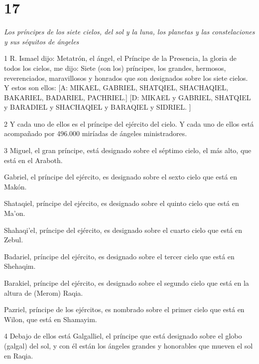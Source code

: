 \chapter{17}

\par \textit{Los príncipes de los siete cielos, del sol y la luna, los planetas y las constelaciones y sus séquitos de ángeles}

\par 1 R. Ismael dijo: Metatrón, el ángel, el Príncipe de la Presencia, la gloria de todos los cielos, me dijo: Siete (son los) príncipes, los grandes, hermosos, reverenciados, maravillosos y honrados que son designados sobre los siete cielos. Y estos son ellos: [A: MIKAEL, GABRIEL, SHATQIEL, SHACHAQIEL, BAKARIEL, BADARIEL, PACHRIEL.] [D: MIKAEL y GABRIEL, SHATQIEL y BARADIEL y SHACHAQIEL y BARAQIEL y SIDRIEL. ]

\par 2 Y cada uno de ellos es el príncipe del ejército del cielo. Y cada uno de ellos está acompañado por 496.000 miríadas de ángeles ministradores.

\par 3 Miguel, el gran príncipe, está designado sobre el séptimo cielo, el más alto, que está en el Araboth.

\par Gabriel, el príncipe del ejército, es designado sobre el sexto cielo que está en Makón.

\par Shataqiel, príncipe del ejército, es designado sobre el quinto cielo que está en Ma'on.

\par Shahaqi'el, príncipe del ejército, es designado sobre el cuarto cielo que está en Zebul.

\par Badariel, príncipe del ejército, es designado sobre el tercer cielo que está en Shehaqim.

\par Barakiel, príncipe del ejército, es designado sobre el segundo cielo que está en la altura de (Merom) Raqia.

\par Pazriel, príncipe de los ejércitos, es nombrado sobre el primer cielo que está en Wilon, que está en Shamayim.

\par 4 Debajo de ellos está Galgalliel, el príncipe que está designado sobre el globo (galgal) del sol, y con él están los ángeles grandes y honorables que mueven el sol en Raqia.

